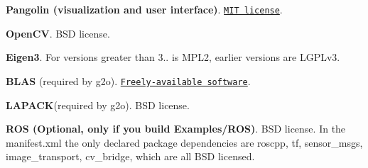 \begin{DoxyItemize}
\item {\bfseries Pangolin (visualization and user interface)}. \href{https://en.wikipedia.org/wiki/MIT_License}{\tt M\-I\-T license}.
\item {\bfseries Open\-C\-V}. B\-S\-D license.
\item {\bfseries Eigen3}. For versions greater than 3.. is M\-P\-L2, earlier versions are L\-G\-P\-Lv3.
\item {\bfseries B\-L\-A\-S} (required by g2o). \href{http://www.netlib.org/blas/#_licensing}{\tt Freely-\/available software}.
\item {\bfseries L\-A\-P\-A\-C\-K}(required by g2o). B\-S\-D license.
\item {\bfseries R\-O\-S (Optional, only if you build Examples/\-R\-O\-S)}. B\-S\-D license. In the manifest.\-xml the only declared package dependencies are roscpp, tf, sensor\-\_\-msgs, image\-\_\-transport, cv\-\_\-bridge, which are all B\-S\-D licensed. 
\end{DoxyItemize}